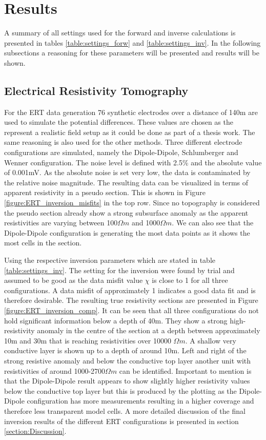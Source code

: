 \section{Results}\label{section:Results}

A summary of all settings used for the forward and inverse calculations is presented in tables \ref{table:settings_forw} and \ref{table:settings_inv}. In the following subsections a reasoning for these parameters will be presented and results will be shown. 

\subsection{Electrical Resistivity Tomography}
For the ERT data generation 76 synthetic electrodes over a distance of 140m are used to simulate the potential differences. These values are chosen as the represent a realistic field setup as it could be done as part of a thesis work. The same reasoning is also used for the other methods. Three different electrode configurations are simulated, namely the Dipole-Dipole, Schlumberger and Wenner configuration. The noise level is defined with 2.5\% and the absolute value of 0.001mV. As the absolute noise is set very low, the data is contaminated by the relative noise magnitude. The resulting data can be visualized in terms of apparent resistivity in a pseudo section. This is shown in Figure \ref{figure:ERT_inversion_misfits} in the top row. Since no topography is considered the pseudo section already show a strong subsurface anomaly as the apparent resistivities are varying between 100$\Omega m$ and 1000$\Omega m$. We can also see that the Dipole-Dipole configuration is generating the most data points as it shows the most cells in the section. 

Using the respective inversion parameters which are stated in table \ref{table:settings_inv}. The setting for the inversion were found by trial and assumed to be good as the data misfit value $\chi$ is close to 1 for all three configurations. A data misfit of approximately 1 indicates a good data fit and is therefore desirable. The resulting true resistivity sections are presented in Figure \ref{figure:ERT_inversion_comp}. It can be seen that all three configurations do not hold significant information below a depth of 40m. They show a strong high-resistivity anomaly in the centre of the section at a depth between approximately 10m and 30m that is reaching resistivities over 10000 $\Omega m$. A shallow very conductive layer is shown up to a depth of around 10m. Left and right of the strong resistive anomaly and below the conductive top layer another unit with resistivities of around 1000-2700$\Omega m$ can be identified. Important to mention is that the Dipole-Dipole result appears to show slightly higher resistivity values below the conductive top layer but this is produced by the plotting as the Dipole-Dipole configuration has more measurements resulting in a higher coverage and therefore less transparent model cells. A more detailed discussion of the final inversion results of the different ERT configurations is presented in section \ref{section:Discussion}.

